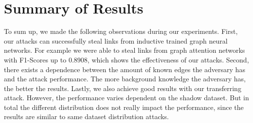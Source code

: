     \section{Summary of Results}
        To sum up, we made the following observations during our experiments.
        First, our attacks can successfully steal links from inductive trained graph neural networks.
        For example we were able to steal links from graph attention networks with F1-Scores up to $0.8908$, which shows the effectiveness of our attacks.
        Second, there exists a dependence between the amount of known edges the adversary has and the attack performance. 
        The more background knowledge the adversary has, the better the results.
        Lastly, we also achieve good results with our transferring attack.
        However, the performance varies dependent on the shadow dataset.
        But in total the different distribution does not really impact the performance, since the results are similar to same dataset distribution attacks. 

